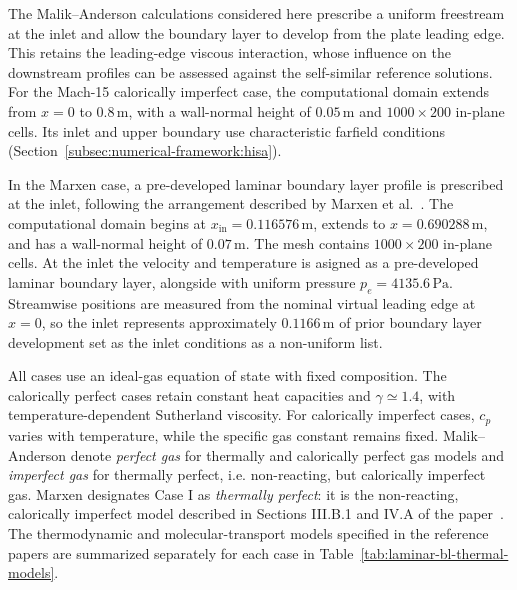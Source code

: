 The Malik--Anderson calculations considered here prescribe a uniform
freestream at the inlet and allow the boundary layer to develop from the
plate leading edge. This retains the leading-edge viscous interaction, whose
influence on the downstream profiles can be assessed against the
self-similar reference solutions. For the Mach-15 calorically imperfect
case, the computational domain extends from \(x=0\) to
\(0.8\,\mathrm{m}\), with a wall-normal height of \(0.05\,\mathrm{m}\)
and \(1000\times200\) in-plane cells. Its inlet and upper boundary use
characteristic farfield conditions (Section~\ref{subsec:numerical-framework:hisa}).
\par\medskip

In the Marxen case, a pre-developed laminar boundary layer profile is
prescribed at the inlet, following the arrangement described by Marxen
et al.~\citep[Section II.B]{Marxen2011HighOrder}. The computational domain
begins at \(x_{\mathrm{in}}=0.116576\,\mathrm{m}\), extends to
\(x=0.690288\,\mathrm{m}\), and has a wall-normal height of
\(0.07\,\mathrm{m}\). The mesh contains \(1000\times200\) in-plane cells.
At the inlet the velocity and temperature is asigned as a pre-developed laminar boundary layer, alongside with uniform pressure \(p_e=4135.6\,\mathrm{Pa}\). Streamwise positions are measured from the nominal virtual leading edge at \(x=0\), so the inlet represents approximately \(0.1166\,\mathrm{m}\) of prior boundary layer development set as the inlet conditions as a non-uniform list.
\par\medskip

All cases use an ideal-gas equation of state with fixed composition.
The calorically perfect cases retain constant heat capacities and
\(\gamma\simeq1.4\), with temperature-dependent Sutherland viscosity.
For calorically imperfect cases, \(c_p\) varies with temperature, while the
specific gas constant remains fixed. Malik--Anderson denote \emph{perfect gas} for thermally and calorically perfect gas models and \emph{imperfect gas} for thermally perfect, i.e. non-reacting, but calorically imperfect gas. Marxen designates Case I as
\emph{thermally perfect}: it is the non-reacting, calorically imperfect model
described in Sections III.B.1 and IV.A of the
paper~\citep{Marxen2011HighOrder}.
The thermodynamic and molecular-transport models specified in the reference
papers are summarized separately for each case in
Table~\ref{tab:laminar-bl-thermal-models}.

